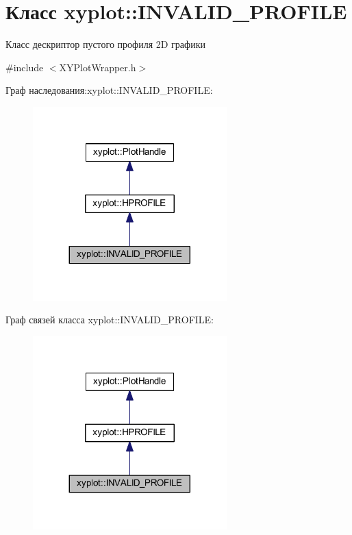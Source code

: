 \hypertarget{classxyplot_1_1_i_n_v_a_l_i_d___p_r_o_f_i_l_e}{\section{Класс xyplot\-:\-:I\-N\-V\-A\-L\-I\-D\-\_\-\-P\-R\-O\-F\-I\-L\-E}
\label{classxyplot_1_1_i_n_v_a_l_i_d___p_r_o_f_i_l_e}
}


Класс дескриптор пустого профиля 2\-D графики  




{\ttfamily \#include $<$X\-Y\-Plot\-Wrapper.\-h$>$}



Граф наследования\-:xyplot\-:\-:I\-N\-V\-A\-L\-I\-D\-\_\-\-P\-R\-O\-F\-I\-L\-E\-:\nopagebreak
\begin{figure}[H]
\begin{center}
\leavevmode
\includegraphics[width=212pt]{classxyplot_1_1_i_n_v_a_l_i_d___p_r_o_f_i_l_e__inherit__graph}
\end{center}
\end{figure}


Граф связей класса xyplot\-:\-:I\-N\-V\-A\-L\-I\-D\-\_\-\-P\-R\-O\-F\-I\-L\-E\-:\nopagebreak
\begin{figure}[H]
\begin{center}
\leavevmode
\includegraphics[width=212pt]{classxyplot_1_1_i_n_v_a_l_i_d___p_r_o_f_i_l_e__coll__graph}
\end{center}
\end{figure}

